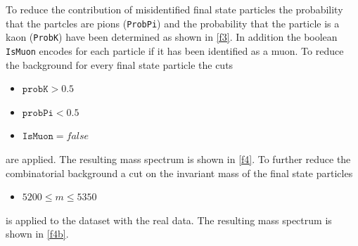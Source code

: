 To reduce the contribution of misidentified final state particles the probability that the
partcles are pions (\texttt{ProbPi}) and the probability that the particle is a kaon (\texttt{ProbK}) have been determined as shown
in \autoref{f3}. In addition the boolean
\texttt{IsMuon} encodes for each particle if it has been identified as a muon.
To reduce the background for every final state particle the cuts
\begin{itemize}
  \item $\texttt{probK} > 0.5$
  \item $\texttt{probPi} < 0.5$
  \item $\texttt{IsMuon} = false$
\end{itemize}
are applied. The resulting mass spectrum is shown in \autoref{f4}.
To further reduce the combinatorial background a cut on the invariant mass of the final state particles
\begin{itemize}
  \item $5200 \leq m \leq 5350$
\end{itemize}
is applied to the dataset with the real data. The resulting mass spectrum is shown in \autoref{f4b}.


